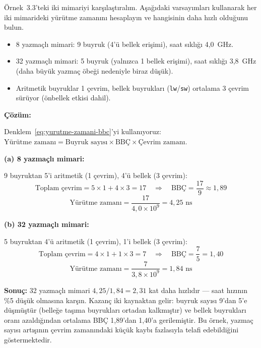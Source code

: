\begin{ornek}[3.4]
\label{orn:yazmac-basarim}
Örnek~3.3'teki iki mimariyi karşılaştıralım. Aşağıdaki varsayımları kullanarak her iki mimarideki yürütme zamanını hesaplayın ve hangisinin daha hızlı olduğunu bulun.

\begin{itemize}[nosep]
\item 8 yazmaçlı mimari: 9 buyruk (4'ü bellek erişimi), saat sıklığı 4{,}0~GHz.
\item 32 yazmaçlı mimari: 5 buyruk (yalnızca 1 bellek erişimi), saat sıklığı 3{,}8~GHz (daha büyük yazmaç öbeği nedeniyle biraz düşük).
\item Aritmetik buyruklar 1 çevrim, bellek buyrukları (\texttt{lw}/\texttt{sw}) ortalama 3 çevrim sürüyor (önbellek etkisi dahil).
\end{itemize}

\textbf{Çözüm:}

Denklem~\ref{eq:yurutme-zamani-bbc}'yi kullanıyoruz: $\text{Yürütme zamanı} = \text{Buyruk sayısı} \times \text{BBÇ} \times \text{Çevrim zamanı}$.

\medskip
\textbf{(a) 8 yazmaçlı mimari:}

9 buyruktan 5'i aritmetik (1 çevrim), 4'ü bellek (3 çevrim):
\[
\text{Toplam çevrim} = 5 \times 1 + 4 \times 3 = 17 \quad\Rightarrow\quad \text{BBÇ} = \frac{17}{9} \approx 1{,}89
\]
\[
\text{Yürütme zamanı} = \frac{17}{4{,}0 \times 10^{9}} = 4{,}25 \text{ ns}
\]

\textbf{(b) 32 yazmaçlı mimari:}

5 buyruktan 4'ü aritmetik (1 çevrim), 1'i bellek (3 çevrim):
\[
\text{Toplam çevrim} = 4 \times 1 + 1 \times 3 = 7 \quad\Rightarrow\quad \text{BBÇ} = \frac{7}{5} = 1{,}40
\]
\[
\text{Yürütme zamanı} = \frac{7}{3{,}8 \times 10^{9}} = 1{,}84 \text{ ns}
\]

\textbf{Sonuç:} 32 yazmaçlı mimari $4{,}25 / 1{,}84 = 2{,}31$ kat daha hızlıdır --- saat hızının \%5 düşük olmasına karşın. Kazanç iki kaynaktan gelir: buyruk sayısı 9'dan 5'e düşmüştür (belleğe taşıma buyrukları ortadan kalkmıştır) ve bellek buyrukları oranı azaldığından ortalama BBÇ 1{,}89'dan 1{,}40'a gerilemiştir. Bu örnek, yazmaç sayısı artışının çevrim zamanındaki küçük kaybı fazlasıyla telafi edebildiğini göstermektedir.
\end{ornek}

